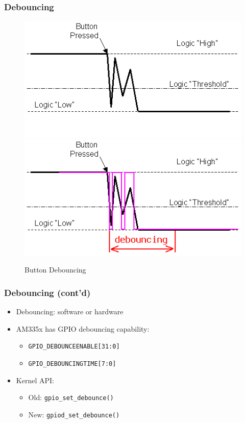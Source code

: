 \documentclass[aspectratio=169,usenames,dvipsnames]{beamer}
\newcounter{cont}
\begin{document}
\begin{frame}
  \frametitle{Debouncing}
  \begin{overlayarea}{\textwidth}{.8\textheight}
    \begin{figure}
      \centering
      {%
      \includegraphics[scale=0.6]{images/debouncing1.png}
      }%
      {%
      \includegraphics[scale=0.6]{images/debouncing2.png}
      }%
      \caption{Button Debouncing}
    \end{figure}
  \end{overlayarea}
\end{frame}

\begin{frame}
  \frametitle{Debouncing (cont'd)}
  \begin{itemize}
    \item Debouncing: software or hardware
    \item AM335x has GPIO debouncing capability:
    \begin{itemize}
      \item \texttt{GPIO\_DEBOUNCEENABLE[31:0]}
      \item \texttt{GPIO\_DEBOUNCINGTIME[7:0]}
    \end{itemize}
    \item Kernel API:
    \begin{itemize}
      \item Old: \texttt{gpio\_set\_debounce()}
      \item New: \texttt{gpiod\_set\_debounce()}
    \end{itemize}
  \end{itemize}
\end{frame}
\end{document}
